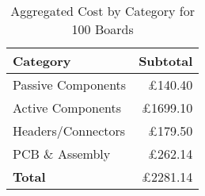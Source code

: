\begin{table}[htbp]
  \centering
  \caption{Aggregated Cost by Category for 100 Boards}
  \label{tab:aggregated-cost}
  \begin{tabular}{@{} l r @{}}
    \toprule
    \textbf{Category}         & \textbf{Subtotal} \\ 
    \midrule
    Passive Components        & £140.40  \\
    Active Components         & £1699.10 \\
    Headers/Connectors        & £179.50  \\
    PCB \& Assembly           & £262.14 \\
    \midrule
    \textbf{Total}            & £2281.14 \\
    \bottomrule
  \end{tabular}
\end{table}


